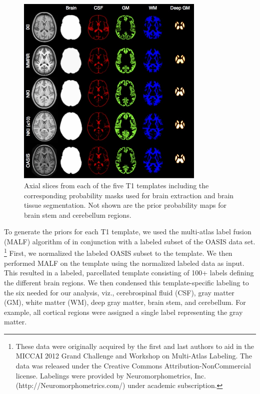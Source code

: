 \begin{figure}
  \centering
  \includegraphics[width=90mm]{Figures/templateProbabilityMasks.jpg}
  \caption{Axial slices from each of the five T1 templates including the corresponding
  probability masks used for brain extraction and brain tissue segmentation.  Not shown
  are the prior probability maps for brain stem and cerebellum regions.
  }
  \label{fig:templateMasks}
\end{figure}


To generate the priors for each T1 template, we used the multi-atlas label fusion (MALF) 
algorithm of \cite{wang2013} in conjunction with a labeled subset of the
OASIS data set.%
\footnote{
These data were originally acquired by the first and last
authors to aid in the MICCAI 2012 Grand Challenge and Workshop on Multi-Atlas Labeling.
The data was released under the Creative Commons Attribution-NonCommercial license. 
Labelings were provided by Neuromorphometrics, Inc. (http://Neuromorphometrics.com/) 
under academic subscription. 
}
First, we normalized the labeled OASIS subset to the template.  
We then performed MALF on the template using the normalized labeled
data as input.  This resulted in a labeled, parcellated template consisting of 100+
labels defining the different brain regions.  We then condensed this template-specific
labeling to the six needed for our analysis, viz., cerebrospinal fluid (CSF), 
gray matter (GM), white matter (WM), deep gray matter, brain stem, and cerebellum.  
For example, all cortical regions were assigned a single label representing the gray matter. 

